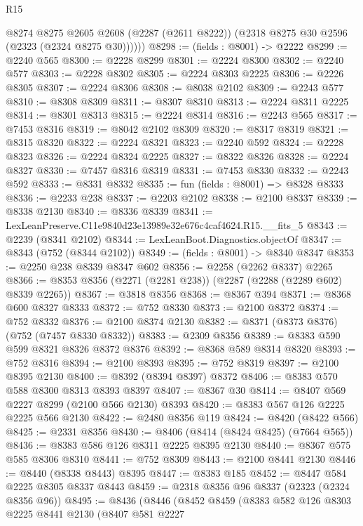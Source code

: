 \begin{lexlean}{R15}
\begin{coremodule}
        @8274
          @8275
          @2605
          @2608
          (@2287 (@2611 @8222))
          (@2318 @8275 @30 @2596 (@2323 (@2324 @8275 @30))))))
@8298 := (fields : @8001) -> @2222
@8299 := @2240 @565
@8300 := @2228 @8299
@8301 := @2224 @8300
@8302 := @2240 @577
@8303 := @2228 @8302
@8305 := @2224 @8303 @2225
@8306 := @2226 @8305
@8307 := @2224 @8306
@8308 := @8038 @2102
@8309 := @2243 @577
@8310 := @8308 @8309
@8311 := @8307 @8310
@8313 := @2224 @8311 @2225
@8314 := @8301 @8313
@8315 := @2224 @8314
@8316 := @2243 @565
@8317 := @7453 @8316
@8319 := @8042 @2102 @8309
@8320 := @8317 @8319
@8321 := @8315 @8320
@8322 := @2224 @8321
@8323 := @2240 @592
@8324 := @2228 @8323
@8326 := @2224 @8324 @2225
@8327 := @8322 @8326
@8328 := @2224 @8327
@8330 := @7457 @8316 @8319
@8331 := @7453 @8330
@8332 := @2243 @592
@8333 := @8331 @8332
@8335 := fun (fields : @8001) => @8328 @8333
@8336 := @2233 @238
@8337 := @2203 @2102
@8338 := @2100 @8337
@8339 := @8338 @2130
@8340 := @8336 @8339
@8341 := LexLeanPreserve.C11e9840d23e13989e32e676c4caf4624.R15.__fits_5
@8343 := @2239 (@8341 @2102)
@8344 := LexLeanBoot.Diagnostics.objectOf
@8347 := @8343 (@752 (@8344 @2102))
@8349 := (fields : @8001) -> @8340 @8347
@8353 := @2250 @238 @8339 @8347 @602
@8356 := @2258 (@2262 @8337) @2265
@8366 := @8353 @8356 (@2271 (@2281 @238)) (@2287 (@2288 (@2289 @602) @8339 @2265))
@8367 := @3818 @8356
@8368 := @8367 @394
@8371 := @8368 @600 @8327 @8333
@8372 := @752 @8330
@8373 := @2100 @8372
@8374 := @752 @8332
@8376 := @2100 @8374 @2130
@8382 := @8371 (@8373 @8376) (@752 (@7457 @8330 @8332))
@8383 := @2309 @8356
@8389 := @8383 @590 @599 @8321 @8326 @8372 @8376
@8392 := @8368 @589 @8314 @8320
@8393 := @752 @8316
@8394 := @2100 @8393
@8395 := @752 @8319
@8397 := @2100 @8395 @2130
@8400 := @8392 (@8394 @8397) @8372
@8406 := @8383 @570 @588 @8300 @8313 @8393 @8397
@8407 := @8367 @30
@8414 := @8407 @569 @2227 @8299 (@2100 @566 @2130) @8393
@8420 := @8383 @567 @126 @2225 @2225 @566 @2130
@8422 := @2480 @8356 @119
@8424 := @8420 (@8422 @566)
@8425 := @2331 @8356
@8430 := @8406 (@8414 (@8424 @8425) (@7664 @565))
@8436 := @8383 @586 @126 @8311 @2225 @8395 @2130
@8440 := @8367 @575 @585 @8306 @8310
@8441 := @752 @8309
@8443 := @2100 @8441 @2130
@8446 := @8440 (@8338 @8443) @8395
@8447 := @8383 @185
@8452 := @8447 @584 @2225 @8305 @8337 @8443
@8459 := @2318 @8356 @96 @8337 (@2323 (@2324 @8356 @96))
@8495 := @8436
    (@8446
      (@8452
        @8459
        (@8383
          @582
          @126
          @8303
          @2225
          @8441
          @2130
          (@8407
            @581
            @2227

\end{coremodule}
\end{lexlean}
